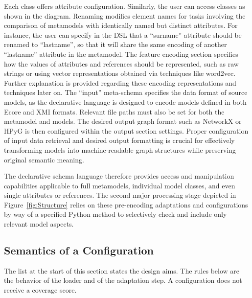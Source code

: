 \documentclass[journal,article,submit,moreauthors,technologies]{Definitions/mdpi}
\newcommand{\rev}[1]{#1}
\begin{document}
Each class offers attribute configuration. Similarly, the user can access classes as shown in the diagram. Renaming modifies element names for tasks involving the comparison of metamodels with identically named but distinct attributes. For instance, the user can specify in the DSL that a ``surname'' attribute should be renamed to ``lastname'', so that it will share the same encoding of another ``lastname'' attribute in the metamodel.
The feature encoding section specifies how the values of attributes and references should be represented, such as raw strings or using vector representations obtained via techniques like word2vec. Further explanation is provided regarding these encoding representations and techniques later on. The ``input'' meta-schema specifies the data format of source models, as the declarative language is designed to encode models defined in both Ecore and XMI formats. Relevant file paths must also be set for both the metamodel and models. The desired output graph format such as NetworkX or HPyG is then configured within the output section settings. Proper configuration of input data retrieval and desired output formatting is crucial for effectively transforming models into machine-readable graph structures while preserving original semantic meaning.

The declarative schema language therefore provides access and manipulation capabilities applicable to full metamodels, individual model classes, and even single attributes or references. The second major processing stage depicted in Figure~\ref{fig:Structure} relies on these pre-encoding adaptations and configurations by way of a specified Python method to selectively check and include only relevant model aspects.

\subsection{\rev{Semantics of a Configuration}}\label{sec:semantics}
\rev{The list at the start of this section states the design aims. The rules below are the behavior of the loader and of the adaptation step. A configuration does not receive a coverage score.}
\end{document}

